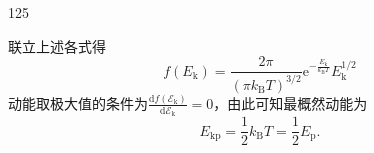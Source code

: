 \begin{solution}{125}
\begin{subsolution}
\begin{equation}
            \label{eq:27.s125}
        \end{equation}
        联立上述各式得
        \begin{equation}
            f (E _ {\mathrm{k}}) = \frac {2 \pi}{(\pi k _ {\mathrm{B}} T) ^ {3 / 2}} \mathrm{e} ^ {- \frac {E _ {\mathrm{k}}}{k _ {\mathrm{B}} T}} E _ {\mathrm{k}} ^ {1 / 2}
            \label{eq:28.s125}
        \end{equation}
        动能取极大值的条件为$\frac { \mathrm { d } f ( \mathcal { E } _ { \mathrm { k } } ) } { \mathrm { d } \mathcal { E } _ { \mathrm { k } } } = 0$，由此可知最概然动能为
        \begin{equation}
            E _ {\mathrm{kp}} = \frac {1}{2} k _ {\mathrm{B}} T = \frac {1}{2} E _ {\mathrm{p}}.
            \label{eq:29.s125}
        \end{equation}
    \end{subsolution}
\end{solution}